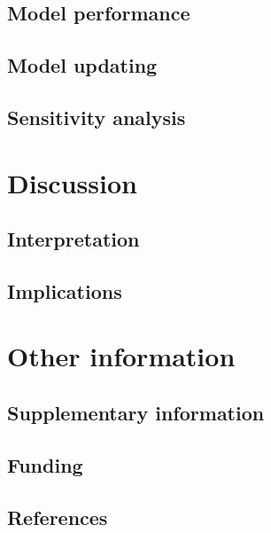 \documentclass[
  letterpaper,
  DIV=11,
  numbers=noendperiod]{scrartcl}
\begin{document}
\subsection{Model performance}\label{model-performance}

\subsection{Model updating}\label{model-updating}

\subsection{Sensitivity analysis}\label{sensitivity-analysis-1}

\section{Discussion}\label{discussion}

\subsection{Interpretation}\label{interpretation}

\subsection{Implications}\label{implications}

\section{Other information}\label{other-information}

\subsection{Supplementary information}\label{supplementary-information}

\subsection{Funding}\label{funding}

\subsection{References}\label{references}
\end{document}
